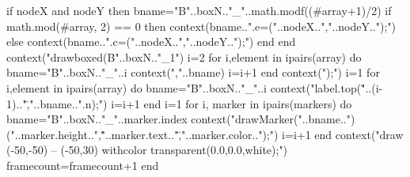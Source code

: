 	if nodeX and nodeY then
		bname="B"..boxN.."_"..math.modf((#array+1)/2)
		if math.mod(#array, 2) == 0 then
			context(bname..".e=("..nodeX..","..nodeY..");")
		else
			context(bname..".c=("..nodeX..","..nodeY..");")
		end
	end		
	context("drawboxed(B"..boxN.."_1")
	i=2
	for i,element in ipairs(array) do
		bname="B"..boxN.."_"..i
		context(","..bname)
		i=i+1
	end
	context(");")
	i=1
	for i,element in ipairs(array) do
		bname="B"..boxN.."_"..i
		context("label.top(\""..(i-1).."\","..bname..".n);")
		i=i+1
	end
	i=1
	for i, marker in ipairs(markers) do 
		bname="B"..boxN.."_"..marker.index
		context("drawMarker("..bname..")("..marker.height..",\""..marker.text.."\","..marker.color..");")
		i=i+1
	end
	context("draw (-50,-50) -- (-50,30) withcolor transparent(0.0,0.0,white);")
	framecount=framecount+1
end
\stopluacode
